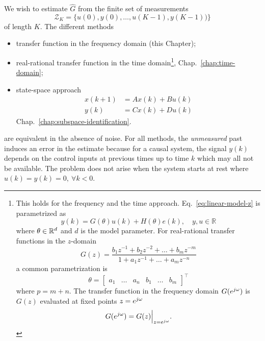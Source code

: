 We wish to estimate $\hat{G}$ from the finite set of measurements
\begin{equation*}
  \mathcal{Z}_K = \{u(0),y(0),\ldots,u(K-1),y(K-1))\}
\end{equation*}
of length $K$. The different methods
\begin{itemize}
\item transfer function in the frequency domain (this Chapter);
\item real-rational transfer function in the time domain\footnote{
    This holds for the frequency and the time approach. Eq.~\eqref{eq:linear-model-z} is parametrized as
    \begin{equation*}
      y(k) = G(\theta)u(k) + H(\theta)e(k),\hspace{1em}y,u \in \mathbb{R}
    \end{equation*}
    where $\theta \in \mathbb{R}^d$ and $d$ is the model parameter. For real-rational transfer functions in the $z$-domain
    \begin{equation}
      G(z) = \frac{b_1z^{-1} + b_2z^{-2} + \ldots + b_mz^{-m}}{1 + a_1z^{-1} + \ldots + a_mz^{-n}}
    \end{equation}
    a common parametrization is
    \begin{equation*}
      \theta =
      \begin{bmatrix}
        a_1 & \ldots & a_n & b_1 & \ldots & b_m
      \end{bmatrix}^\top
    \end{equation*}
    where $p = m+n$. The transfer function in the frequency domain $G(e^{j\omega})$ is $G(z)$ evaluated at fixed points $z=e^{j\omega}$
    \begin{equation*}
      G(e^{j\omega}) = G(z)\Big|_{z=e^{j\omega}}.
    \end{equation*}}, Chap.~\ref{chap:time-domain};
\item state-space approach
  \begin{equation*}
    \begin{aligned}
      x(k+1) &= Ax(k) + Bu(k) \\
      y(k) &= Cx(k) + Du(k)
    \end{aligned}
  \end{equation*}
  Chap.~\ref{chap:subspace-identification}.
\end{itemize}
are equivalent in the absence of noise. For all methods, the \emph{unmeasured} past induces an error in the estimate because for a causal system, the signal $y(k)$ depends on the control inputs at previous times up to time $k$ which may all not be available. The problem does not arise when the system starts at rest where $u(k)=y(k)=0,\ \forall k<0$.

